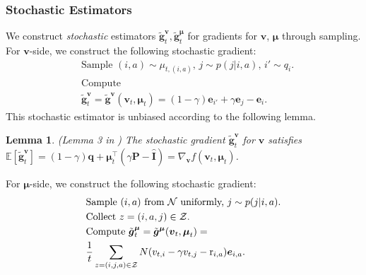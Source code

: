 \documentclass[12pt]{article}
\newtheorem{lemma}{Lemma}
\begin{document}
\subsubsection{Stochastic Estimators}

We construct \textit{stochastic} estimators $\tilde{\boldsymbol{g}}^{\boldsymbol{v}}_t, \tilde{\boldsymbol{g}}^{\boldsymbol{\mu}}_t$ for gradients for $\boldsymbol{v}$, $\boldsymbol{\mu}$ through sampling. For $\boldsymbol{v}$-side, we construct the following stochastic gradient:
\begin{equation}
    \begin{aligned}
    & \text{Sample $(i,a) \sim \mu_{t,(i,a)}$, $j \sim p(j|i,a)$, $i'  \sim q_i$.} \\
    & \text{Compute} \\
    & \tilde{\boldsymbol{g}}^{\boldsymbol{v}}_t = \tilde{\boldsymbol{g}}^{\boldsymbol{v}}(\boldsymbol{v}_t,\boldsymbol{\mu}_t) = (1 - \gamma) \boldsymbol{e}_{i'} + \gamma \boldsymbol{e}_{j} - \boldsymbol{e}_i.
    \end{aligned}
    \label{eq:smd-prediction-noupper-v-gradient}
\end{equation}
This stochastic estimator is unbiased according to the following lemma.

\begin{lemma}{(Lemma 3 in \cite{jin2020efficiently})}
    The stochastic gradient $\tilde{\boldsymbol{g}}_t^{\boldsymbol{v}}$ for $\boldsymbol{v}$ satisfies $\mathbb{E}[\tilde{\boldsymbol{g}}_t^{\boldsymbol{v}}] = (1-\gamma) \boldsymbol{q} + \boldsymbol{\mu}_t^{\top} (\gamma \boldsymbol{\text{P}} - \hat{\boldsymbol{\text{I}}}) = \nabla_{\boldsymbol{v}} f(\boldsymbol{v}_t,\boldsymbol{\mu}_t)$. 
    \label{lem:property-gradient-v-noupper-unbiase}
\end{lemma}

For $\boldsymbol{\mu}$-side, we construct the following stochastic gradient:
\begin{equation}
    \begin{aligned}
        & \text{Sample $(i,a)$ from $ \mathcal{N}$ uniformly, $j \sim p(j|i,a)$.}\\
        & \text{Collect $z = (i,a,j) \in \mathcal{Z}$.} \\
        & \text{Compute $\tilde{\boldsymbol{g}}^{\boldsymbol{\mu}}_t = \tilde{\boldsymbol{g}}^{\boldsymbol{\mu}}(\boldsymbol{v}_t,\boldsymbol{\mu}_t) =$} \\
        & \frac{1}{t} \sum_{z = (i,j,a) \in \mathcal{Z}} N ( v_{t,i} - \gamma v_{t,j} - \text{r}_{i,a}) \boldsymbol{e}_{i,a}.
    \end{aligned}
    \label{eq:smd-prediction-noupper-mu-gradient}
\end{equation}
\end{document}
